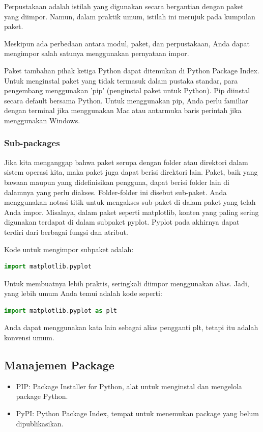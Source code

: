 \documentclass{article}
\begin{document}
Perpustakaan adalah istilah yang digunakan secara bergantian dengan paket yang diimpor. Namun, dalam praktik umum, istilah ini merujuk pada kumpulan paket.

Meskipun ada perbedaan antara modul, paket, dan perpustakaan, Anda dapat mengimpor salah satunya menggunakan pernyataan impor.

Paket tambahan pihak ketiga Python dapat ditemukan di Python Package Index. Untuk menginstal paket yang tidak termasuk dalam pustaka standar, para pengembang menggunakan 'pip' (penginstal paket untuk Python). Pip diinstal secara default bersama Python. Untuk menggunakan pip, Anda perlu familiar dengan terminal jika menggunakan Mac atau antarmuka baris perintah jika menggunakan Windows.

\subsubsection{Sub-packages}
Jika kita menganggap bahwa paket serupa dengan folder atau direktori dalam sistem operasi kita, maka paket juga dapat berisi direktori lain. Paket, baik yang bawaan maupun yang didefinisikan pengguna, dapat berisi folder lain di dalamnya yang perlu diakses. Folder-folder ini disebut sub-paket. Anda menggunakan notasi titik untuk mengakses sub-paket di dalam paket yang telah Anda impor. Misalnya, dalam paket seperti matplotlib, konten yang paling sering digunakan terdapat di dalam subpaket pyplot. Pyplot pada akhirnya dapat terdiri dari berbagai fungsi dan atribut.

Kode untuk mengimpor subpaket adalah:
\begin{lstlisting}[language=Python, caption={}, captionpos=b]
import matplotlib.pyplot
\end{lstlisting}

Untuk membuatnya lebih praktis, seringkali diimpor menggunakan alias. Jadi, yang lebih umum Anda temui adalah kode seperti:
\begin{lstlisting}[language=Python, caption={}, captionpos=b]
import matplotlib.pyplot as plt
\end{lstlisting}
Anda dapat menggunakan kata lain sebagai alias pengganti plt, tetapi itu adalah konvensi umum.

\subsection{Manajemen Package}
\begin{itemize}
    \item PIP: Package Installer for Python, alat untuk menginstal dan mengelola package Python.
    \item PyPI: Python Package Index, tempat untuk menemukan package yang belum dipublikasikan.
\end{itemize}
\end{document}
